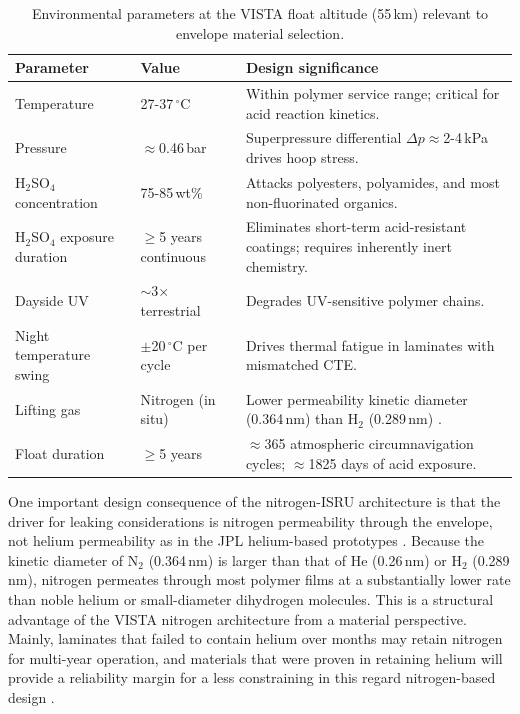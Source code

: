 \begin{table}[H]
\centering
\caption{Environmental parameters at the VISTA float altitude (55\,km) relevant to envelope material selection.}
\label{tab:float-environment}
\footnotesize
\renewcommand{\arraystretch}{1.15}
\setlength{\tabcolsep}{5pt}
\begin{tabularx}{\linewidth}{@{}p{3.35cm} p{2.6cm} X@{}}
\toprule
\textbf{Parameter} & \textbf{Value} & \textbf{Design significance} \\
\midrule
Temperature & 27-37\,$^\circ$C & Within polymer service range; critical for acid reaction kinetics. \\
Pressure & $\approx$0.46\,bar & Superpressure differential $\Delta p \approx$2-4\,kPa drives hoop stress. \\
H$_2$SO$_4$ concentration & 75-85\,wt\% & Attacks polyesters, polyamides, and most non-fluorinated organics. \\
H$_2$SO$_4$ exposure duration & $\geq$5 years continuous & Eliminates short-term acid-resistant coatings; requires inherently inert chemistry. \\
Dayside UV & $\sim$3$\times$ terrestrial & Degrades UV-sensitive polymer chains. \\
Night temperature swing & $\pm$20\,$^\circ$C per cycle & Drives thermal fatigue in laminates with mismatched CTE. \\
Lifting gas & Nitrogen (in situ) & Lower permeability kinetic diameter (0.364\,nm) than H$_2$ (0.289\,nm) \cite{PolyimideGasTransport2024}. \\
Float duration & $\geq$5 years & $\approx$365 atmospheric circumnavigation cycles; $\approx$1825 days of acid exposure. \\
\bottomrule
\end{tabularx}
\end{table}

\noindent One important design consequence of the nitrogen-ISRU architecture is that the driver for leaking considerations is nitrogen permeability through the envelope, not helium permeability as in the JPL helium-based prototypes \cite{Hall2007_VenusPrototype,Hall2009_SecondGen}. Because the kinetic diameter of N$_2$ (0.364\,nm) is larger than that of He (0.26\,nm) or H$_2$ (0.289\,nm), nitrogen permeates through most polymer films at a substantially lower rate than noble helium or small-diameter dihydrogen molecules. This is a structural advantage of the VISTA nitrogen architecture from a material perspective. Mainly, laminates that failed to contain helium over months may retain nitrogen for multi-year operation, and materials that were proven in retaining helium will provide a reliability margin for a less constraining in this regard nitrogen-based design \cite{Sebok2015_PTFEpermeability}.

